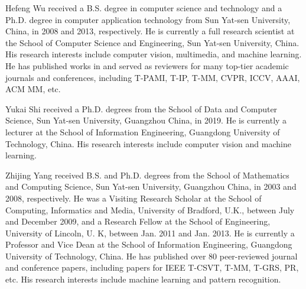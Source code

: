\documentclass[lettersize,journal]{IEEEtran}
\begin{document}
\begin{IEEEbiography}{Hefeng Wu} received a B.S. degree in computer science and technology and a Ph.D. degree in computer application technology from Sun Yat-sen University, China, in 2008 and 2013, respectively. He is currently a full research scientist at the School of Computer Science and Engineering, Sun Yat-sen University, China. His research interests include computer vision, multimedia, and machine learning. He has published works in and served as reviewers for many top-tier academic journals and conferences, including T-PAMI, T-IP, T-MM, CVPR, ICCV, AAAI, ACM MM, etc. \end{IEEEbiography}

\begin{IEEEbiography}{Yukai Shi}
received a Ph.D. degrees from the School of Data and Computer Science, Sun Yat-sen University, Guangzhou China, in 2019. He is currently a lecturer at the School of Information Engineering, Guangdong University of Technology, China. His research interests include computer vision and machine learning.
\end{IEEEbiography}

\begin{IEEEbiography}{Zhijing Yang} received B.S. and Ph.D. degrees from the School of Mathematics and Computing Science, Sun Yat-sen University, Guangzhou China, in 2003 and 2008, respectively. He was a Visiting Research Scholar at the School of Computing, Informatics and Media, University of Bradford, U.K., between July and December 2009, and a Research Fellow at the School of Engineering, University of Lincoln, U. K, between Jan. 2011 and Jan. 2013. He is currently a Professor and Vice Dean at the School of Information Engineering, Guangdong University of Technology, China. He has published over 80 peer-reviewed journal and conference papers, including papers for IEEE T-CSVT, T-MM, T-GRS, PR, etc. His research interests include machine learning and pattern recognition.
\end{IEEEbiography}
\end{document}
